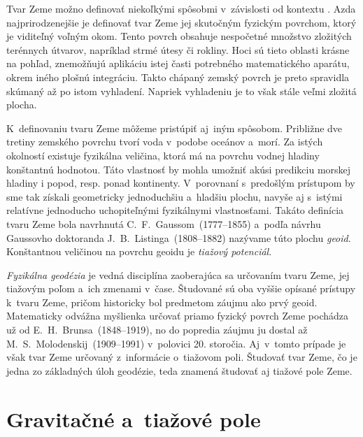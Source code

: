 \documentclass[a4paper, 12pt]{book}
\begin{document}
Tvar Zeme možno definovať niekoľkými spôsobmi v~závislosti od kontextu 
\parencite{MoritzTheFigureOfTheEarth}.  Azda najprirodzenejšie je definovať 
tvar Zeme jej skutočným fyzickým povrchom, ktorý je viditeľný voľným okom.  
Tento povrch obsahuje nespočetné množstvo zložitých terénnych útvarov, 
napríklad strmé útesy či rokliny.  Hoci sú tieto oblasti krásne na pohľad, 
znemožňujú aplikáciu istej časti potrebného matematického aparátu, okrem iného 
plošnú integráciu.  Takto chápaný zemský povrch je preto spravidla skúmaný až 
po istom vyhladení.  Napriek vyhladeniu je to však stále veľmi zložitá plocha.

K~definovaniu tvaru Zeme môžeme pristúpiť aj~iným spôsobom.  Približne dve 
tretiny zemského povrchu tvorí voda v~podobe oceánov a~morí.  Za istých 
okolností existuje fyzikálna veličina, ktorá má na povrchu vodnej hladiny 
konštantnú hodnotou.  Táto vlastnosť by mohla umožniť akúsi predikciu morskej 
hladiny i popod, resp. ponad kontinenty.  V~porovnaní s~predošlým prístupom by 
sme tak získali geometricky jednoduchšiu a~hladšiu plochu, navyše aj s~istými 
relatívne jednoducho uchopiteľnými fyzikálnymi vlastnosťami.  Takáto definícia 
tvaru Zeme bola navrhnutá C.~F.~Gaussom~(1777--1855) a~podľa návrhu Gaussovho 
doktoranda J.~B.~Listinga~(1808--1882) nazývame túto plochu \emph{geoid}.  
Konštantnou veličinou na povrchu geoidu je \emph{tiažový potenciál}.

\emph{Fyzikálna geodézia} je vedná disciplína zaoberajúca sa určovaním tvaru 
Zeme, jej tiažovým poľom a~ich zmenami v~čase.  Študované sú oba vyššie opísané 
prístupy k~tvaru Zeme, pričom historicky bol predmetom záujmu ako prvý geoid.  
Matematicky odvážna myšlienka určovať priamo fyzický povrch Zeme pochádza už od 
E.~H.~Brunsa~(1848--1919), no do popredia záujmu ju dostal až 
M.~S.~Molodenskij~(1909--1991) v~polovici 20. storočia.  Aj~v~tomto prípade je 
však tvar Zeme určovaný z~informácie o~tiažovom poli.  Študovať tvar Zeme, čo 
je jedna zo základných úloh geodézie, teda znamená študovať aj tiažové pole 
Zeme.







\chapter{Gravitačné a~tiažové pole}
\label{sec:gravitational_and_gravity_field}
\end{document}
